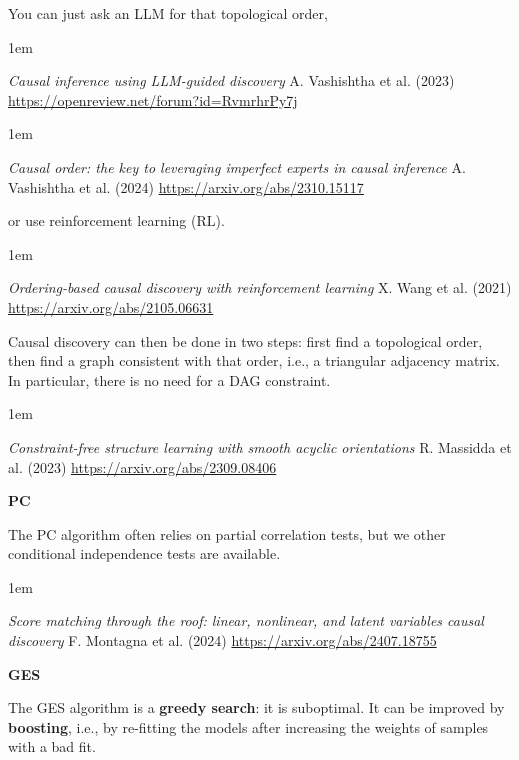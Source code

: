 \documentclass[a5paper]{article}
\let\d\textbf
\newenvironment{reference}{%
  \medskip\goodbreak
  \parskip 0pt
  \raggedright
  \leftskip 1em
  \obeylines
}{\par\medskip\goodbreak}
\def\subsection#1{{\par\bigskip\goodbreak\large\bfseries #1\par}}
\begin{document}
You can just ask an LLM for that topological order,

\begin{reference}
  \emph{Causal inference using LLM-guided discovery}
  A. Vashishtha et al. (2023)
  \url{https://openreview.net/forum?id=RvmrhrPy7j}
\end{reference}

\begin{reference}
  \emph{Causal order: the key to leveraging  imperfect experts in causal inference}
  A. Vashishtha et al. (2024)
  \url{https://arxiv.org/abs/2310.15117}
\end{reference}

or use reinforcement learning (RL).

\begin{reference}
  \emph{Ordering-based causal discovery  with reinforcement learning}
  X. Wang et al. (2021)
  \url{https://arxiv.org/abs/2105.06631}
\end{reference}

Causal discovery can then be done in two steps: first find a topological order,
then find a graph consistent with that order, i.e., a triangular adjacency matrix.
In particular, there is no need for a DAG constraint.

\begin{reference}
  \emph{Constraint-free structure learning  with smooth acyclic orientations}
  R. Massidda et al. (2023)
  \url{https://arxiv.org/abs/2309.08406}
\end{reference}

\subsection{PC}

The PC algorithm often relies on partial correlation tests,
but we other conditional independence tests are available.

\begin{reference}
  \emph{Score matching through the roof:  linear, nonlinear, and latent variables  causal discovery}
  F. Montagna et al. (2024)
  \url{https://arxiv.org/abs/2407.18755}
\end{reference}

\subsection{GES}

The GES algorithm is a \d{greedy search}: it is suboptimal.
It can be improved by \d{boosting}, i.e.,
by re-fitting the models after increasing the weights of samples with a bad fit.
\end{document}

